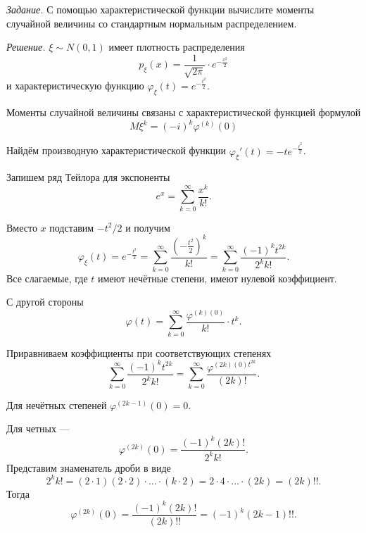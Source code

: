\textit{Задание.} С помощью характеристической функции вычислите моменты случайной величины со стандартным нормальным распределением.

\textit{Решение.} $ \xi \sim N \left( 0, 1 \right) $ имеет плотность распределения
$$p_{ \xi } \left( x \right) =
\frac{1}{ \sqrt{2 \pi }} \cdot e^{- \frac{x^2}{2}}$$
и характеристическую функцию $ \varphi_{ \xi } \left( t \right) = e^{- \frac{t^2}{2}}$.

Моменты случайной величины связаны с характеристической функцией формулой
\begin{equation}\label{eq:connection}
  M \xi^k =
\left( -i \right)^k \varphi^{ \left( k \right) } \left( 0 \right) 
\end{equation}

Найдём производную характеристической функции $ \varphi_{ \xi }' \left( t \right) = -te^{- \frac{t^2}{2}}$.

Запишем ряд Тейлора для экспоненты
$$e^x =
\sum \limits_{k = 0}^{ \infty } \frac{x^k}{k!}.$$

Вместо $x$ подставим $-t^2 / 2$ и получим
$$ \varphi_{ \xi } \left( t \right) =
e^{- \frac{t^2}{2}} =
\sum \limits_{k = 0}^{ \infty } \frac{ \left( - \frac{t^2}{2} \right)^k}{k!} =
\sum \limits_{k = 0}^{ \infty } \frac{ \left( -1 \right)^k t^{2k}}{2^k k!}.$$
Все слагаемые, где $t$ имеют нечётные степени, имеют нулевой коэффициент.

С другой стороны
$$ \varphi \left( t \right) =
\sum \limits_{k = 0}^{ \infty } \frac{ \varphi^{ \left( k \right) \left( 0 \right) }}{k!} \cdot t^k.$$

Приравниваем коэффициенты при соответствующих степенях
$$ \sum \limits_{k = 0}^{ \infty } \frac{ \left( -1 \right)^k t^{2k}}{2^k k!} =
\sum \limits_{k = 0}^{ \infty } \frac{ \varphi^{ \left( 2k \right) \left( 0 \right) t^{2k}}}{ \left( 2k \right)!}.$$

Для нечётных степеней $ \varphi^{ \left( 2k - 1 \right) } \left( 0 \right) = 0$.

Для четных ---
$$ \varphi^{ \left( 2k \right) } \left( 0 \right) =
\frac{ \left( -1 \right)^k \left( 2k \right)!}{2^k k!}.$$
Представим знаменатель дроби в виде
$$2^k k! =
\left( 2 \cdot 1 \right) \left( 2 \cdot 2 \right) \cdot \dotsc \cdot \left( k \cdot 2 \right) =
2 \cdot 4 \cdot \dotsc \cdot \left( 2k \right) =
\left( 2k \right)!!.$$
Тогда
$$ \varphi^{ \left( 2k \right) } \left( 0 \right) =
\frac{ \left( -1 \right)^k \left( 2k \right)!}{ \left( 2k \right)!!} =
\left( -1 \right)^k \left( 2k - 1 \right)!!.$$

